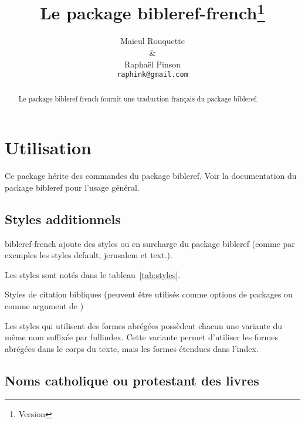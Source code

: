 \documentclass{ltxdoc}
\begin{document}
\shorthandoff{:}
\title{Le package \textsf{bibleref-french}\thanks{Version \BRFfileversion}}
\author{Ma\"ieul Rouquette \\ \& \\ Rapha\"el Pinson \\ \texttt{raphink@gmail.com}}

\maketitle
\begin{abstract}
Le  package \textsf{bibleref-french} fournit une traduction français du package \textsf{bibleref}.
\end{abstract}

\tableofcontents
\section{Utilisation}

Ce package hérite des commandes du package \textsf{bibleref}. Voir la documentation du package \textsf{bibleref} pour l'usage général.

\subsection{Styles additionnels}

\textsf{bibleref-french} ajoute des styles ou en surcharge du package \textsf{bibleref} (comme par exemples les styles \textsf{default}, \textsf{jerusalem} et \textsf{text}.).

Les styles sont notés dans le tableau~\ref{tab:styles}.

\begin{table}[tbh]
\caption{Styles de citation bibliques  (peuvent être utilisés comme options de  packages ou comme argument de  )}
\label{tab:styles}
\vspace{10pt}
\begin{center}

\end{center}
\end{table}

Les styles qui utilisent des formes abrégées possèdent chacun une variante du même nom suffixée par \textsf{fullindex}. Cette variante permet d'utiliser les formes abrégées dans le corps du texte, mais les formes étendues dans l'index.

\subsection{Noms catholique ou protestant des livres}
\end{document}
